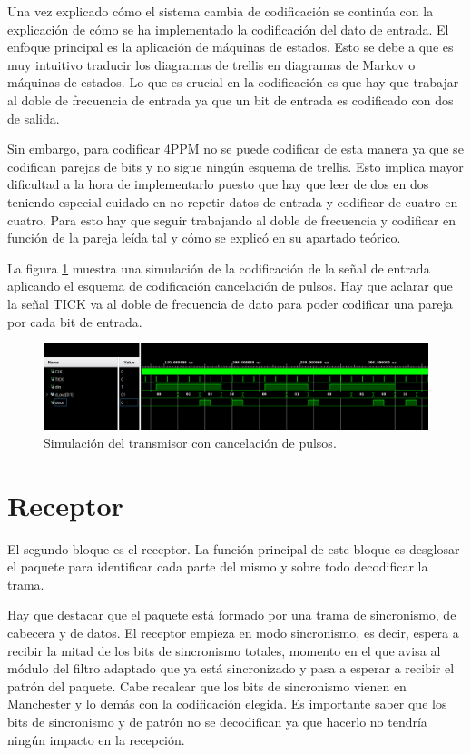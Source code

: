 Una vez explicado cómo el sistema cambia de codificación se continúa con la explicación 
de cómo se ha implementado la codificación del dato de entrada. El enfoque principal es 
la aplicación de máquinas de estados. Esto se debe a que es muy intuitivo traducir
los diagramas de trellis en diagramas de Markov o máquinas de estados. Lo que es 
crucial en la codificación es que hay que trabajar al doble de frecuencia de entrada
ya que un bit de entrada es codificado con dos de salida. 

Sin embargo, para codificar 4PPM no se puede codificar de esta manera ya que se 
codifican parejas de bits y no sigue ningún esquema de trellis. Esto implica mayor 
dificultad a la hora de implementarlo puesto que hay que leer de dos en dos teniendo
especial cuidado en no repetir datos de entrada y codificar de cuatro en cuatro. Para
esto hay que seguir trabajando al doble de frecuencia y codificar en función de la 
pareja leída tal y cómo se explicó en su apartado teórico.

La figura \ref{sim_tx_cancel} muestra una simulación de la codificación de la señal de entrada 
aplicando el esquema de codificación cancelación de pulsos. Hay que aclarar que 
la señal TICK va al doble de frecuencia de dato para poder codificar una pareja 
por cada bit de entrada. 

\begin{figure}[ht]
    \centering
    \includegraphics[scale=0.35]{./figuras/sim_cod_cancel.png}
    \caption{\small{Simulación del transmisor con cancelación de pulsos.}}
    \label{sim_tx_cancel}%
\end{figure}

\section{Receptor}
El segundo bloque es el receptor. La función principal de este bloque es desglosar el 
paquete para identificar cada parte del mismo y sobre todo decodificar la trama.

Hay que destacar que el paquete está formado por una trama de sincronismo, de cabecera
y de datos. El receptor empieza en modo sincronismo, es decir, espera a recibir 
la mitad de los bits de sincronismo totales, momento en el que avisa al módulo del 
filtro adaptado que ya está sincronizado y pasa a esperar a recibir el patrón del 
paquete. Cabe recalcar que los bits de sincronismo vienen en Manchester y lo demás
con la codificación elegida. Es importante saber que los bits de sincronismo y de 
patrón no se decodifican ya que hacerlo no tendría ningún impacto en la recepción.

